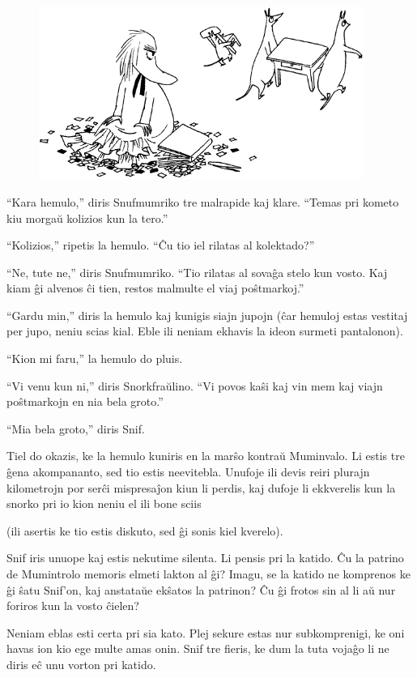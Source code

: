 \begin{figure}[htbp]
\centering
\includegraphics[width=301pt,height=160pt]{8-3.png}
\caption{}
\label{8-3}
\end{figure}

``Kara hemulo,'' diris Snufmumriko tre malrapide kaj klare. ``Temas pri kometo kiu morgaŭ kolizios kun la tero.''

``Kolizios,'' ripetis la hemulo. ``Ĉu tio iel rilatas al kolektado?''

``Ne, tute ne,'' diris Snufmumriko. ``Tio rilatas al sovaĝa stelo kun vosto. Kaj kiam ĝi alvenos ĉi tien, restos malmulte el viaj poŝtmarkoj.''

``Gardu min,'' diris la hemulo kaj kunigis siajn jupojn (ĉar hemuloj estas vestitaj per jupo, neniu scias kial. Eble ili neniam ekhavis la ideon surmeti pantalonon).

``Kion mi faru,'' la hemulo do pluis.

``Vi venu kun ni,'' diris Snorkfraŭlino. ``Vi povos kaŝi kaj vin mem kaj viajn poŝtmarkojn en nia bela groto.''

``Mia bela groto,'' diris Snif.

\sectionbreak

Tiel do okazis, ke la hemulo kuniris en la marŝo kontraŭ Muminvalo. Li estis tre ĝena akompananto, sed tio estis neevitebla. Unufoje ili devis reiri plurajn kilometrojn por serĉi mispresaĵon kiun li perdis, kaj dufoje li ekkverelis kun la snorko pri io kion neniu el ili bone sciis

(ili asertis ke tio estis diskuto, sed ĝi sonis kiel kverelo).

Snif iris unuope kaj estis nekutime silenta. Li pensis pri la katido. Ĉu la patrino de Mumintrolo memoris elmeti lakton al ĝi? Imagu, se la katido ne komprenos ke ĝi ŝatu Snif'on, kaj anstataŭe ekŝatos la patrinon? Ĉu ĝi frotos sin al li aŭ nur foriros kun la vosto ĉielen?

Neniam eblas esti certa pri sia kato. Plej sekure estas nur subkomprenigi, ke oni havas ion kio ege multe amas onin. Snif tre fieris, ke dum la tuta vojaĝo li ne diris eĉ unu vorton pri katido.

